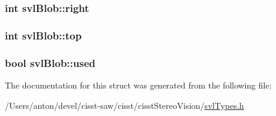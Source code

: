 \subsubsection[{right}]{\setlength{\rightskip}{0pt plus 5cm}int svl\+Blob\+::right}\label{structsvl_blob_a49a7d67d8af30cb95f4ff0cef20d8dde}
\hypertarget{structsvl_blob_a6f36e9987b39314c8d8e77070f5c4ae8}{}
\subsubsection[{top}]{\setlength{\rightskip}{0pt plus 5cm}int svl\+Blob\+::top}\label{structsvl_blob_a6f36e9987b39314c8d8e77070f5c4ae8}
\hypertarget{structsvl_blob_a08ce50cc736dfb4bdcd8a14c4e4831a5}{}
\subsubsection[{used}]{\setlength{\rightskip}{0pt plus 5cm}bool svl\+Blob\+::used}\label{structsvl_blob_a08ce50cc736dfb4bdcd8a14c4e4831a5}


The documentation for this struct was generated from the following file\+:\begin{DoxyCompactItemize}
\item 
/\+Users/anton/devel/cisst-\/saw/cisst/cisst\+Stereo\+Vision/\hyperlink{svl_types_8h}{svl\+Types.\+h}\end{DoxyCompactItemize}
